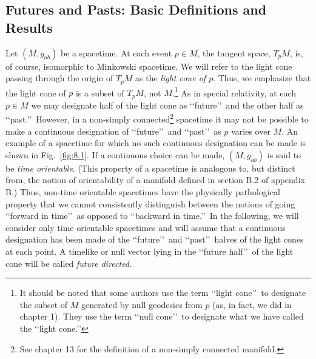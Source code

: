 
\subsection{Futures and Pasts: Basic Definitions and Results}\label{sec:8.1}
\setcounter{theorem}{0}

Let \((M,g_{ab})\) be a spacetime. At each event \(p\in M\), the tangent space,
\(T_pM\), is, of course, isomorphic to Minkowski spacetime. We will refer to the light
cone passing through the origin of \(T_pM\) as the \emph{light cone of \(p\)}. Thus, we
emphasize that the light cone of \(p\) is a subset of \(T_pM\), not \(M\).\footnote{It
should be noted that some authors use the term \lq\lq light cone\rq\rq\ to designate the subset
of \(M\) generated by null geodesics from \(p\) (as, in fact, we did in chapter 1). They
use the term \lq\lq null cone\rq\rq\ to designate what we have called the \lq\lq light cone.\rq\rq} As in
special relativity, at each \(p\in M\) we may designate half of the light cone as
\lq\lq future\rq\rq\ and the other half as \lq\lq past.\rq\rq\ However, in a non-simply
connected\footnote{See chapter 13 for the definition of a non-simply connected manifold.}
spacetime it may not be possible to make a continuous designation of \lq\lq future\rq\rq\ and
\lq\lq past\rq\rq\ as \(p\) varies over \(M\). An example of a spacetime for which no such
continuous designation can be made is shown in Fig.~\ref{fig:8.1}. If a continuous
choice can be made, \((M,g_{ab})\) is said to be \emph{time orientable}. (This property
of a spacetime is analogous to, but distinct from, the notion of orientability of a
manifold defined in section B.2 of appendix B.) Thus, non-time orientable spacetimes
have the physically pathological property that we cannot consistently distinguish
between the notions of going \lq\lq forward in time\rq\rq\ as opposed to \lq\lq backward in time.\rq\rq\
In the following, we will consider only time orientable spacetimes and will assume
that a continuous designation has been made of the \lq\lq future\rq\rq\ and \lq\lq past\rq\rq\ halves of
the light cones at each point. A timelike or null vector lying in the \lq\lq future half\rq\rq\
of the light cone will be called \emph{future directed}.

